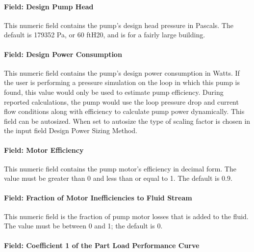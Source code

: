 \paragraph{Field: Design Pump Head}\label{field-design-pump-head}

This numeric field contains the pump's design head pressure in Pascals. The default is 179352 Pa, or 60 ftH20, and is for a fairly large building.

\paragraph{Field: Design Power Consumption}\label{field-design-power-consumption}

This numeric field contains the pump's design power consumption in Watts. If the user is performing a pressure simulation on the loop in which this pump is found, this value would only be used to estimate pump efficiency. During reported calculations, the pump would use the loop pressure drop and current flow conditions along with efficiency to calculate pump power dynamically. This field can be autosized. When set to autosize the type of scaling factor is chosen in the input field Design Power Sizing Method.

\paragraph{Field: Motor Efficiency}\label{field-motor-efficiency-000}

This numeric field contains the pump motor's efficiency in decimal form. The value must be greater than 0 and less than or equal to 1. The default is 0.9.

\paragraph{Field: Fraction of Motor Inefficiencies to Fluid Stream}\label{field-fraction-of-motor-inefficiencies-to-fluid-stream}

This numeric field is the fraction of pump motor losses that is added to the fluid. The value must be between 0 and 1; the default is 0.

\paragraph{Field: Coefficient 1 of the Part Load Performance Curve}\label{field-coefficient-1-of-the-part-load-performance-curve}

